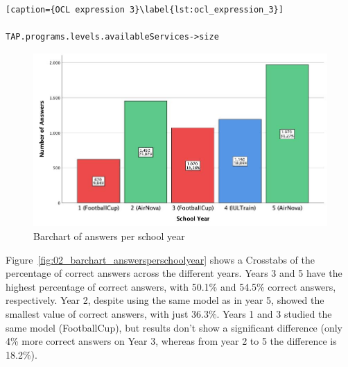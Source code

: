 \begin{lstlisting}[caption={OCL expression 3}\label{lst:ocl_expression_3}]

TAP.programs.levels.availableServices->size
\end{lstlisting}

\begin{figure}[ht]
\centering
\includegraphics[width=1\textwidth]{Chapters/figures/6_Results/Section2/01_Barchart_AnswersPerYear.jpg}
\caption{Barchart of answers per school year}
\label{fig:01_barchart_answersperschoolyear}
\end{figure}

Figure~\ref{fig:02_barchart_answersperschoolyear} shows a Crosstabs of the percentage of correct answers across the different years. Years 3 and 5 have the highest percentage of correct answers, with 50.1\% and 54.5\% correct answers, respectively. Year 2, despite using the same model as in year 5, showed the smallest value of correct answers, with just 36.3\%. Years 1 and 3 studied the same model (FootballCup), but results don't show a significant difference (only 4\% more correct answers on Year 3, whereas from year 2 to 5 the difference is 18.2\%). 

